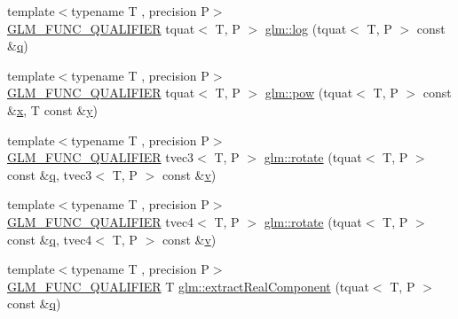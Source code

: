 \begin{DoxyCompactItemize}
\item 
{\footnotesize template$<$typename T , precision P$>$ }\\\mbox{\hyperlink{setup_8hpp_a33fdea6f91c5f834105f7415e2a64407}{G\+L\+M\+\_\+\+F\+U\+N\+C\+\_\+\+Q\+U\+A\+L\+I\+F\+I\+ER}} tquat$<$ T, P $>$ \mbox{\hyperlink{group__gtx__quaternion_ga791f42e134bfe97fc9c96f4668dd7489}{glm\+::log}} (tquat$<$ T, P $>$ const \&\mbox{\hyperlink{glad_8h_a514729309336df22bcc8eda979d6ced4}{q}})
\item 
{\footnotesize template$<$typename T , precision P$>$ }\\\mbox{\hyperlink{setup_8hpp_a33fdea6f91c5f834105f7415e2a64407}{G\+L\+M\+\_\+\+F\+U\+N\+C\+\_\+\+Q\+U\+A\+L\+I\+F\+I\+ER}} tquat$<$ T, P $>$ \mbox{\hyperlink{group__gtx__quaternion_ga42a0cf206c59eaeff4c67dd62e09a580}{glm\+::pow}} (tquat$<$ T, P $>$ const \&\mbox{\hyperlink{glad_8h_a92d0386e5c19fb81ea88c9f99644ab1d}{x}}, T const \&\mbox{\hyperlink{glad_8h_a66ddd433d2cacfe27f5906b7e86faeed}{y}})
\item 
{\footnotesize template$<$typename T , precision P$>$ }\\\mbox{\hyperlink{setup_8hpp_a33fdea6f91c5f834105f7415e2a64407}{G\+L\+M\+\_\+\+F\+U\+N\+C\+\_\+\+Q\+U\+A\+L\+I\+F\+I\+ER}} tvec3$<$ T, P $>$ \mbox{\hyperlink{group__gtx__quaternion_ga9f39f0d3ecd66839a4af44560aa10fb2}{glm\+::rotate}} (tquat$<$ T, P $>$ const \&\mbox{\hyperlink{glad_8h_a514729309336df22bcc8eda979d6ced4}{q}}, tvec3$<$ T, P $>$ const \&\mbox{\hyperlink{glad_8h_a14cfbe2fc2234f5504618905b69d1e06}{v}})
\item 
{\footnotesize template$<$typename T , precision P$>$ }\\\mbox{\hyperlink{setup_8hpp_a33fdea6f91c5f834105f7415e2a64407}{G\+L\+M\+\_\+\+F\+U\+N\+C\+\_\+\+Q\+U\+A\+L\+I\+F\+I\+ER}} tvec4$<$ T, P $>$ \mbox{\hyperlink{group__gtx__quaternion_ga96575f8868b3f2aa3e13cab9b94ccbd3}{glm\+::rotate}} (tquat$<$ T, P $>$ const \&\mbox{\hyperlink{glad_8h_a514729309336df22bcc8eda979d6ced4}{q}}, tvec4$<$ T, P $>$ const \&\mbox{\hyperlink{glad_8h_a14cfbe2fc2234f5504618905b69d1e06}{v}})
\item 
{\footnotesize template$<$typename T , precision P$>$ }\\\mbox{\hyperlink{setup_8hpp_a33fdea6f91c5f834105f7415e2a64407}{G\+L\+M\+\_\+\+F\+U\+N\+C\+\_\+\+Q\+U\+A\+L\+I\+F\+I\+ER}} T \mbox{\hyperlink{group__gtx__quaternion_ga90de879d97487ec804522dd418e5d8a0}{glm\+::extract\+Real\+Component}} (tquat$<$ T, P $>$ const \&\mbox{\hyperlink{glad_8h_a514729309336df22bcc8eda979d6ced4}{q}})
\item 

\end{DoxyCompactItemize}

